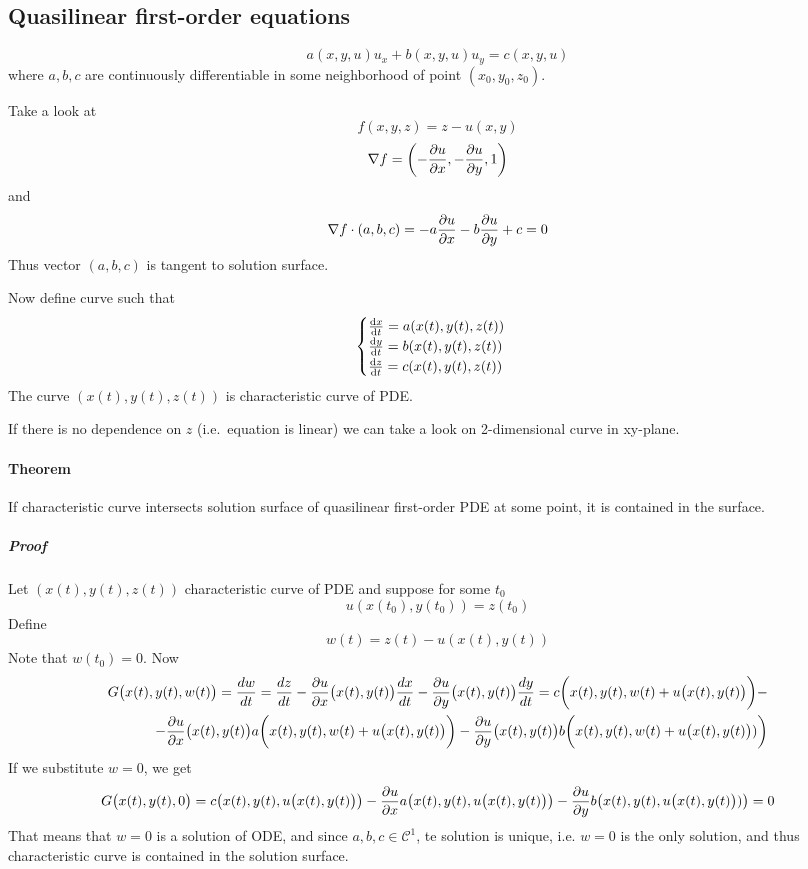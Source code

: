 \subsection{Quasilinear first-order equations}
$$a(x,y,u)u_x + b(x,y,u)u_y = c(x,y,u)$$
where $a,b,c$ are continuously differentiable in some neighborhood of point $(x_0,y_0,z_0)$.

Take a look at
$$f(x,y,z) = z - u(x,y)$$
$$\nabla f = \left(-\pdv{u}{x},-\pdv{u}{y},1\right)$$
and
$$\nabla f \cdot (a,b,c) = -a\pdv{u}{x} -b\pdv{u}{y}+c  = 0$$
Thus vector $(a,b,c) $ is tangent to solution surface.

Now define curve such that
$$\begin{cases}
\dv{x}{t} = a(x(t), y(t), z(t))\\
\dv{y}{t} = b(x(t), y(t), z(t))\\
\dv{z}{t} = c(x(t), y(t), z(t))
\end{cases}$$
The curve $\left(x(t), y(t), z(t)\right)$ is characteristic curve of PDE.

If there is no dependence on $z$ (i.e.\ equation is linear) we can take a look on 2-dimensional curve in xy-plane.

\paragraph{Theorem}
If characteristic curve intersects solution surface of quasilinear first-order PDE at some point, it is contained in the surface.
\subparagraph{Proof}
Let $\left(x(t), y(t), z(t)\right)$ characteristic curve of PDE and suppose for some $t_0$ 
$$u(x(t_0), y(t_0)) = z(t_0)$$
Define 
$$w(t) = z(t) - u(x(t),y(t))$$
Note that $w(t_0) = 0$.  Now
\begin{align*}
G\big(x(t),y(t), w(t)\big) = \frac{dw}{dt} = \frac{dz}{dt} - \pdv{u}{x}\big(x(t), y(t)\big) \frac{dx}{dt}-  \pdv{u}{y}\big(x(t), y(t)\big) \frac{dy}{dt} = c\bigg(x(t),y(t),w(t)+u\big(x(t),y(t)\big)\bigg) -\\- \pdv{u}{x}\big(x(t), y(t)\big) a\bigg(x(t),y(t),w(t)+u\big(x(t),y(t)\big)\bigg) - \pdv{u}{y}\big(x(t), y(t)\big) b\bigg(x(t),y(t),w(t)+u\big(x(t),y(t)\big))\bigg)
\end{align*}
If we substitute $w=0$, we get
$$G\big(x(t),y(t), 0\big) = c\big(x(t),y(t),u\big(x(t),y(t)\big)\big) -\pdv{u}{x}(x(t), y(t)) a\big(x(t),y(t),u\big(x(t),y(t)\big)\big) - \pdv{u}{y}(x(t), y(t)) b\big(x(t),y(t),u\big(x(t),y(t)\big))\big)=0$$
That means that $w=0$ is a solution of ODE, and since $a,b,c\in \mathcal{C}^1$, te solution is unique, i.e. $w=0$ is the only solution, and thus characteristic curve is contained in the solution surface.

